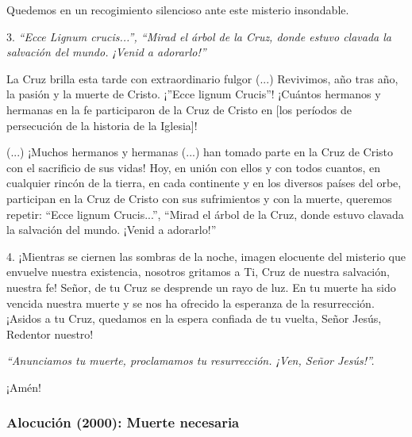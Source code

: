 			\begin{body}Quedemos en un recogimiento silencioso ante este misterio insondable.\end{body}
			
			\begin{body}3.\textit{ “Ecce Lignum crucis...”, “Mirad el árbol de la Cruz, donde estuvo clavada la salvación del mundo. ¡Venid a adorarlo!”}\end{body}
			
			\begin{body}La Cruz brilla esta tarde con extraordinario fulgor (...) Revivimos, año tras año, la pasión y la muerte de Cristo. ¡”Ecce lignum Crucis”! ¡Cuántos hermanos y hermanas en la fe participaron de la Cruz de Cristo en [los períodos de persecución de la historia de la Iglesia]!\end{body}
			
			\begin{body}(...) ¡Muchos hermanos y hermanas (...) han tomado parte en la Cruz de Cristo con el sacrificio de sus vidas! Hoy, en unión con ellos y con todos cuantos, en cualquier rincón de la tierra, en cada continente y en los diversos países del orbe, participan en la Cruz de Cristo con sus sufrimientos y con la muerte, queremos repetir: “Ecce lignum Crucis...”, “Mirad el árbol de la Cruz, donde estuvo clavada la salvación del mundo. ¡Venid a adorarlo!”\end{body}
			
			\begin{body}4. ¡Mientras se ciernen las sombras de la noche, imagen elocuente del misterio que envuelve nuestra existencia, nosotros gritamos a Ti, Cruz de nuestra salvación, nuestra fe! Señor, de tu Cruz se desprende un rayo de luz. En tu muerte ha sido vencida nuestra muerte y se nos ha ofrecido la esperanza de la resurrección. ¡Asidos a tu Cruz, quedamos en la espera confiada de tu vuelta, Señor Jesús, Redentor nuestro! \end{body}
			
			\begin{body}\textit{“Anunciamos tu muerte, proclamamos tu resurrección. ¡Ven, Señor Jesús!”.}\end{body}
			
			\begin{body}¡Amén!\end{body}
			
			\subsubsection{Alocución (2000): Muerte necesaria}
			
